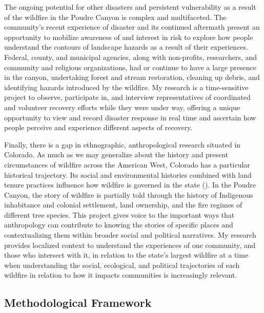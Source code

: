 \documentclass[
]{article}
\begin{document}
The ongoing potential for other disasters and persistent vulnerability as a result of the wildfire in the Poudre Canyon is complex and multifaceted. The community's recent experience of disaster and its continued aftermath present an opportunity to mobilize awareness of and interest in risk to explore how people understand the contours of landscape hazards as a result of their experiences. Federal, county, and municipal agencies, along with non-profits, researchers, and community and religious organizations, had or continue to have a large presence in the canyon, undertaking forest and stream restoration, cleaning up debris, and identifying hazards introduced by the wildfire. My research is a time-sensitive project to observe, participate in, and interview representatives of coordinated and volunteer recovery efforts while they were under way, offering a unique opportunity to view and record disaster response in real time and ascertain how people perceive and experience different aspects of recovery.

Finally, there is a gap in ethnographic, anthropological research situated in Colorado. As much as we may generalize about the history and present circumstances of wildfire across the American West, Colorado has a particular historical trajectory. Its social and environmental histories combined with land tenure practices influence how wildfire is governed in the state (). In the Poudre Canyon, the story of wildfire is partially told through the history of Indigenous inhabitance and colonial settlement, land ownership, and the fire regimes of different tree species. This project gives voice to the important ways that anthropology can contribute to knowing the stories of specific places and contextualizing them within broader social and political narratives. My research provides localized context to understand the experiences of one community, and those who intersect with it, in relation to the state's largest wildfire at a time when understanding the social, ecological, and political trajectories of each wildfire in relation to how it impacts communities is increasingly relevant.

\subsection{Methodological Framework}\label{methodological-framework}
\end{document}
